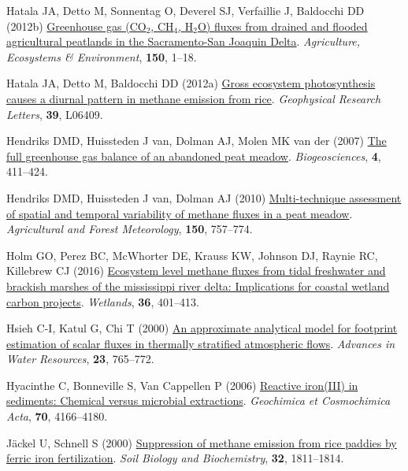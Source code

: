 \documentclass[
  12pt,
]{article}
\newlength{\cslhangindent}
\newenvironment{CSLReferences}[2] %
 {\begin{list}{}{%
  \setlength{\itemindent}{0pt}
  \setlength{\leftmargin}{0pt}
  \setlength{\parsep}{0pt}
  \ifodd #1
   \setlength{\leftmargin}{\cslhangindent}
   \setlength{\itemindent}{-1\cslhangindent}
  \fi
  \setlength{\itemsep}{#2\baselineskip}}}
 {\end{list}}
\begin{document}
\begin{CSLReferences}{1}{0}
Hatala JA, Detto M, Sonnentag O, Deverel SJ, Verfaillie J, Baldocchi DD
(2012b) \href{https://doi.org/10.1016/j.agee.2012.01.009}{Greenhouse gas
({CO}\(_2\), {CH}\(_4\), {H\(_2\)O}) fluxes from drained and flooded
agricultural peatlands in the {Sacramento-San Joaquin Delta}}.
\emph{Agriculture, Ecosystems \& Environment}, \textbf{150}, 1--18.

Hatala JA, Detto M, Baldocchi DD (2012a)
\href{https://doi.org/10.1029/2012GL051303}{Gross ecosystem
photosynthesis causes a diurnal pattern in methane emission from rice}.
\emph{Geophysical Research Letters}, \textbf{39}, L06409.

Hendriks DMD, Huissteden J van, Dolman AJ, Molen MK van der (2007)
\href{https://doi.org/10.5194/bg-4-411-2007}{The full greenhouse gas
balance of an abandoned peat meadow}. \emph{Biogeosciences}, \textbf{4},
411--424.

Hendriks DMD, Huissteden J van, Dolman AJ (2010)
\href{https://doi.org/10.1016/j.agrformet.2009.06.017}{Multi-technique
assessment of spatial and temporal variability of methane fluxes in a
peat meadow}. \emph{Agricultural and Forest Meteorology}, \textbf{150},
757--774.

Holm GO, Perez BC, McWhorter DE, Krauss KW, Johnson DJ, Raynie RC,
Killebrew CJ (2016)
\href{https://doi.org/10.1007/s13157-016-0746-7}{Ecosystem level methane
fluxes from tidal freshwater and brackish marshes of the mississippi
river delta: Implications for coastal wetland carbon projects}.
\emph{Wetlands}, \textbf{36}, 401--413.

Hsieh C-I, Katul G, Chi T (2000)
\href{https://doi.org/10.1016/S0309-1708(99)00042-1}{An approximate
analytical model for footprint estimation of scalar fluxes in thermally
stratified atmospheric flows}. \emph{Advances in Water Resources},
\textbf{23}, 765--772.

Hyacinthe C, Bonneville S, Van Cappellen P (2006)
\href{https://doi.org/10.1016/j.gca.2006.05.018}{Reactive iron({III}) in
sediments: Chemical versus microbial extractions}. \emph{Geochimica et
Cosmochimica Acta}, \textbf{70}, 4166--4180.

Jäckel U, Schnell S (2000)
\href{https://doi.org/10.1016/S0038-0717(00)00094-8}{Suppression of
methane emission from rice paddies by ferric iron fertilization}.
\emph{Soil Biology and Biochemistry}, \textbf{32}, 1811--1814.


\end{CSLReferences}
\end{document}
